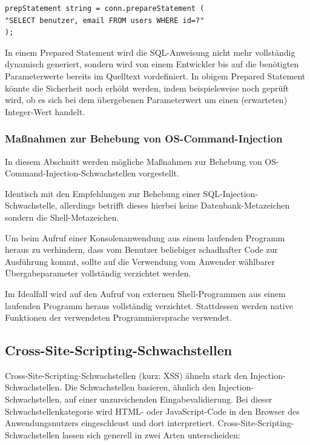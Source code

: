 \begin{lstlisting}[basicstyle=\ttfamily\footnotesize]
prepStatement string = conn.prepareStatement (
"SELECT benutzer, email FROM users WHERE id=?"
);
\end{lstlisting}

In einem Prepared Statement wird die SQL-Anweisung nicht mehr 
vollständig dynamisch generiert, sondern wird von einem Entwickler 
bis auf die benötigten Parameterwerte bereits im Quelltext vordefiniert. 
In obigem Prepared Statement könnte die Sicherheit noch erhöht werden, 
indem beispielsweise noch geprüft wird, ob es sich bei dem übergebenen 
Parameterwert um einen (erwarteten) Integer-Wert handelt.

\subsubsection{Maßnahmen zur Behebung von OS-Command-Injection}

In diesem Abschnitt werden mögliche Maßnahmen zur Behebung von 
OS-Command-Injection-Schwachstellen vorgestellt.


Identisch mit den Empfehlungen zur Behebung einer SQL-Injection-Schwachstelle, 
allerdings betrifft dieses hierbei keine Datenbank-Metazeichen sondern die 
Shell-Metazeichen.


Um beim Aufruf einer Konsolenanwendung aus einem laufenden Programm 
heraus zu verhindern, dass vom Benutzer beliebiger schadhafter Code zur 
Ausführung kommt, sollte auf die Verwendung vom Anwender wählbarer 
Übergabeparameter vollständig verzichtet werden.


Im Idealfall wird auf den Aufruf von externen Shell-Programmen aus einem 
laufenden Programm heraus vollständig verzichtet. Stattdessen werden 
native Funktionen der verwendeten Programmiersprache verwendet.


\subsection{Cross-Site-Scripting-Schwachstellen}

Cross-Site-Scripting-Schwachstellen (kurz: XSS) ähneln stark den 
Injection-Schwachstellen. Die Schwachstellen basieren, ähnlich den 
Injection-Schwachstellen, auf einer unzureichenden Eingabevalidierung. 
Bei dieser Schwachstellenkategorie wird HTML- oder JavaScript-Code in den 
Browser des Anwendungsnutzers eingeschleust und dort interpretiert. 
Cross-Site-Scripting-Schwachstellen lassen sich generell in zwei 
Arten unterscheiden:


